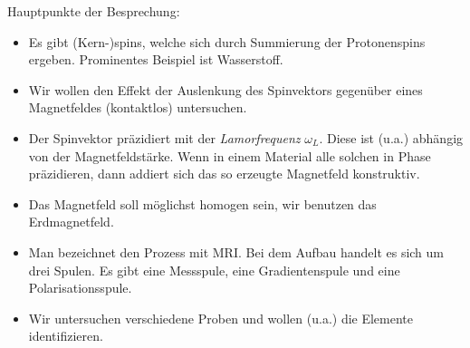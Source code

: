 \documentclass[../main.tex]{subfiles}
\begin{document}
    Hauptpunkte der Besprechung:
    \begin{itemize}
        \item Es gibt (Kern-)spins, welche sich durch Summierung der Protonenspins ergeben. Prominentes Beispiel ist Wasserstoff.
        \item Wir wollen den Effekt der Auslenkung des Spinvektors gegenüber eines Magnetfeldes (kontaktlos) untersuchen. 
        \item Der Spinvektor präzidiert mit der \emph{Lamorfrequenz} $\omega_L$. Diese ist (u.a.) abhängig von der Magnetfeldstärke. Wenn in einem Material alle solchen in Phase präzidieren, dann addiert sich das so erzeugte Magnetfeld konstruktiv. 
        \item Das Magnetfeld soll möglichst homogen sein, wir benutzen das Erdmagnetfeld.
        \item Man bezeichnet den Prozess mit MRI. Bei dem Aufbau handelt es sich um drei Spulen. Es gibt eine Messspule, eine Gradientenspule und eine Polarisationsspule.
        \item Wir untersuchen verschiedene Proben und wollen (u.a.) die Elemente identifizieren. 
    \end{itemize}
\end{document}
